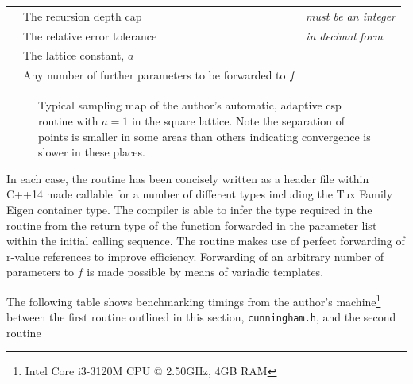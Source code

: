 \documentclass[a4paper, 12pt]{article}
\begin{document}
\begin{listliketab}
	\begin{tabular}{lll}
	\textbullet &The recursion depth cap &{\it must be an integer}\\
	\textbullet &The relative error tolerance &{\it in decimal form}\\
	\textbullet &The lattice constant, $a$ & \\
	\textbullet &Any number of further parameters to be forwarded to $f$&\\
	\end{tabular}
\end{listliketab}
\pgfplotsset{width=6.3in}
\pgfplotsset{height=6.3in}
\begin{figure}[H]
\caption{\footnotesize
	Typical sampling map of the author's automatic, adaptive \gls{csp} routine with $a=1$ in the square lattice. Note the separation of points is smaller in some areas than others indicating convergence is slower in these places. }
\end{figure}
In each case, the routine has been concisely written as a header file within C++14 made callable for a number of different types including the Tux Family Eigen container type. The compiler is able to infer the type required in the routine from the return type of the function forwarded in the parameter list within the initial calling sequence. The routine makes use of perfect forwarding of r-value references to improve efficiency.
Forwarding of an arbitrary number of parameters to $f$ is made possible by means of variadic templates.
\\\par The following table shows benchmarking timings from the author's machine\footnote{Intel Core i3-3120M CPU @ 2.50GHz, 4GB RAM} between the first routine outlined in this section, {\tt cunningham.h}, and the second routine
\end{document}
